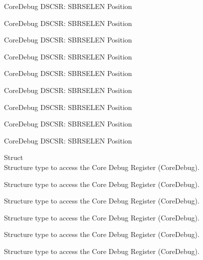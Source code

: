 \begin{DoxyRefList}
\label{deprecated__deprecated000650}%
%
Core\+Debug DSCSR\+: SBRSELEN Position 

\label{deprecated__deprecated000775}%
%
Core\+Debug DSCSR\+: SBRSELEN Position 

\label{deprecated__deprecated000829}%
%
Core\+Debug DSCSR\+: SBRSELEN Position 

\label{deprecated__deprecated000905}%
%
Core\+Debug DSCSR\+: SBRSELEN Position 

\label{deprecated__deprecated000968}%
%
Core\+Debug DSCSR\+: SBRSELEN Position 

\label{deprecated__deprecated001047}%
%
Core\+Debug DSCSR\+: SBRSELEN Position 

\label{deprecated__deprecated001123}%
%
Core\+Debug DSCSR\+: SBRSELEN Position 

\label{deprecated__deprecated001226}%
%
Core\+Debug DSCSR\+: SBRSELEN Position 

\label{deprecated__deprecated001328}%
%
Core\+Debug DSCSR\+: SBRSELEN Position  
\item[Struct \doxylink{struct_core_debug___type}{Core\+Debug\+\_\+\+Type} ]\hfill \\
\label{deprecated__deprecated000004}%
%
Structure type to access the Core Debug Register (Core\+Debug). 

\label{deprecated__deprecated000104}%
%
Structure type to access the Core Debug Register (Core\+Debug). 

\label{deprecated__deprecated000158}%
%
Structure type to access the Core Debug Register (Core\+Debug). 

\label{deprecated__deprecated000243}%
%
Structure type to access the Core Debug Register (Core\+Debug). 

\label{deprecated__deprecated000300}%
%
Structure type to access the Core Debug Register (Core\+Debug). 

\label{deprecated__deprecated000376}%
%
Structure type to access the Core Debug Register (Core\+Debug). 


\end{DoxyRefList}
